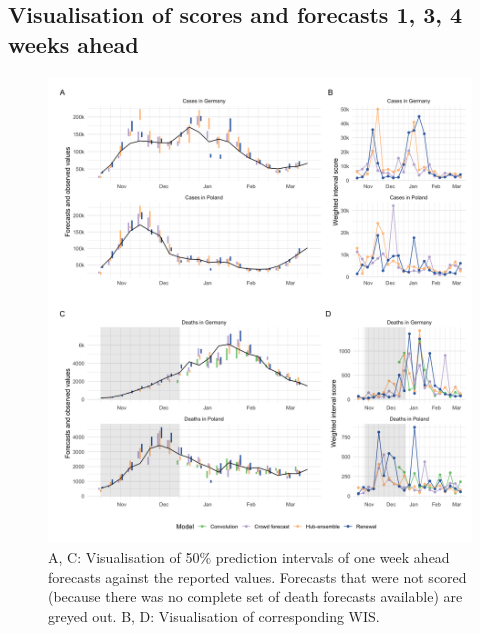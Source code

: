 \documentclass[
]{article}
\providecommand{\DIFaddend}{} %
\DeclareRobustCommand{\DIFaddend}{\DIFOaddend \let\includegraphics\DIFOincludegraphics} %
\begin{document}
\DIFaddend \clearpage

\hypertarget{visualisation-of-scores-and-forecasts-1-3-4-weeks-ahead}{%
\subsection{Visualisation of scores and forecasts 1, 3, 4 weeks ahead}\label{visualisation-of-scores-and-forecasts-1-3-4-weeks-ahead}}

\begin{figure}[H]
\includegraphics[width=1\linewidth,]{../analysis/plots/figure-forecasts-1} \caption{A, C: Visualisation of 50\% prediction intervals of one week ahead forecasts against the reported values. Forecasts that were not scored (because there was no complete set of death forecasts available) are greyed out. B, D: Visualisation of corresponding WIS.}\label{fig:forecasts-and-truth-1}
\end{figure}
\end{document}
